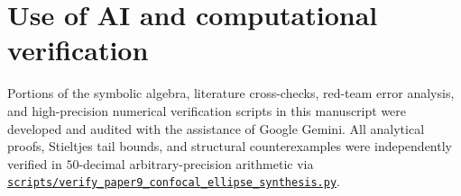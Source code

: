 \documentclass[11pt,reqno]{amsart}
\theoremstyle{plain}
\theoremstyle{definition}
\theoremstyle{remark}
\numberwithin{equation}{section}
\begin{document}
\section*{Use of AI and computational verification}

Portions of the symbolic algebra, literature cross-checks, red-team error analysis, and high-precision numerical verification scripts in this manuscript were developed and audited with the assistance of Google Gemini. All analytical proofs, Stieltjes tail bounds, and structural counterexamples were independently verified in $50$-decimal arbitrary-precision arithmetic via \href{https://github.com/thijsmissiaen/paper9-confocal-ellipse-synthesis/blob/main/scripts/verify_paper9_confocal_ellipse_synthesis.py}{\texttt{scripts/verify\_\allowbreak paper9\_\allowbreak confocal\_\allowbreak ellipse\_\allowbreak synthesis.py}}.
\end{document}
